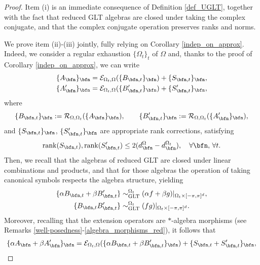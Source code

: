 \documentclass{amsart}
\begin{document}
\begin{proof}
    Item (i) is an immediate consequence of Definition \ref{def_UGLT}, together with the fact that reduced GLT algebras are closed under taking the complex conjugate, and that the complex conjugate operation preserves ranks and norms.

    We prove item (ii)-(iii) jointly, fully relying on Corollary \ref{indep_on_approx}. Indeed, we consider a regular exhaustion $\{\Omega_t\}_t$ of $\Omega$ and, thanks to the proof of Corollary \ref{indep_on_approx}, we can write
    \begin{align*}
         \{A_\bfn\}_\bfn&=\mathcal{E}_{\Omega_t,\Omega}(\{B_{\bfn,t}\}_\bfn)+\{S_{\bfn,t}\}_{\bfn},\\
          \{A'_\bfn\}_\bfn&=\mathcal{E}_{\Omega_t,\Omega}(\{B'_{\bfn,t}\}_\bfn)+\{S'_{\bfn,t}\}_{\bfn},
    \end{align*}
    where
    \begin{equation*}
        \{B_{\bfn,t}\}_\bfn:=\mathcal{R}_{\Omega,\Omega_t}(\{A_\bfn\}_\bfn),\qquad\{B'_{\bfn,t}\}_\bfn:=\mathcal{R}_{\Omega,\Omega_t}(\{A'_\bfn\}_\bfn),
    \end{equation*}
    and $\{S_{\bfn,t}\}_\bfn$, $\{S'_{\bfn,t}\}_\bfn$ are appropriate rank corrections, satisfying
    \begin{equation*}
        \mathrm{rank}(S_{\bfn,t}),\mathrm{rank}(S'_{\bfn,t})\leq 2(d_{\bfn}^{\Omega}-d_\bfn^{\Omega_t}),\quad\forall \bfn,\,\forall t.
    \end{equation*}
    Then, we recall that the algebras of reduced GLT are closed under linear combinations and products, and that for those algebras the operation of taking canonical symbols respects the algebra structure, yielding 
    \begin{align*}
        \{\alpha B_{\bfn,t}+\beta B'_{\bfn,t}\}&\sim_{\mathrm{GLT}}^{\Omega_t}(\alpha f+\beta g)|_{\Omega_t\times[-\pi,\pi]^d},\\
        \{B_{\bfn,t} B'_{\bfn,t}\}&\sim_{\mathrm{GLT}}^{\Omega_t} (fg)|_{\Omega_t\times[-\pi,\pi]^d}.
    \end{align*}
    Moreover, recalling that the extension operators are $*$-algebra morphisms (see Remarks \ref{well-posedness}-\ref{algebra_morphisms_red}), it follows that
    \begin{equation}\label{main_eq_1}
        \{\alpha A_\bfn+\beta A'_\bfn\}_\bfn=\mathcal{E}_{\Omega_t,\Omega}(\{\alpha B_{\bfn,t}+\beta B'_{\bfn,t}\}_\bfn)+\{S_{\bfn,t}+S'_{\bfn,t}\}_{\bfn},
    \end{equation}

\end{proof}
\end{document}
